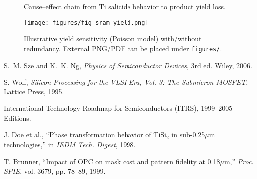\documentclass[conference]{IEEEtran}
\begin{document}
\begin{figure}[t]
\centering
{}
\caption{Cause--effect chain from Ti salicide behavior to product yield loss.}
\label{fig:cause_effect}
\end{figure}

\begin{figure}[t]
\centering
\texttt{[image: figures/fig\_sram\_yield.png]}
\caption{Illustrative yield sensitivity (Poisson model) with/without redundancy. External PNG/PDF can be placed under \texttt{figures/}.}
\label{fig:sram_yield}
\end{figure}

\begin{thebibliography}{99}

S.~M. Sze and K.~K. Ng, \emph{Physics of Semiconductor Devices}, 3rd ed. Wiley, 2006.

S. Wolf, \emph{Silicon Processing for the VLSI Era, Vol. 3: The Submicron MOSFET}, Lattice Press, 1995.

International Technology Roadmap for Semiconductors (ITRS), 1999--2005 Editions.

J. Doe et al., ``Phase transformation behavior of TiSi$_2$ in sub-0.25$\mu$m technologies,'' in \emph{IEDM Tech. Digest}, 1998.

T. Brunner, ``Impact of OPC on mask cost and pattern fidelity at 0.18$\mu$m,'' \emph{Proc. SPIE}, vol. 3679, pp. 78--89, 1999.

\end{thebibliography}

\end{document}
